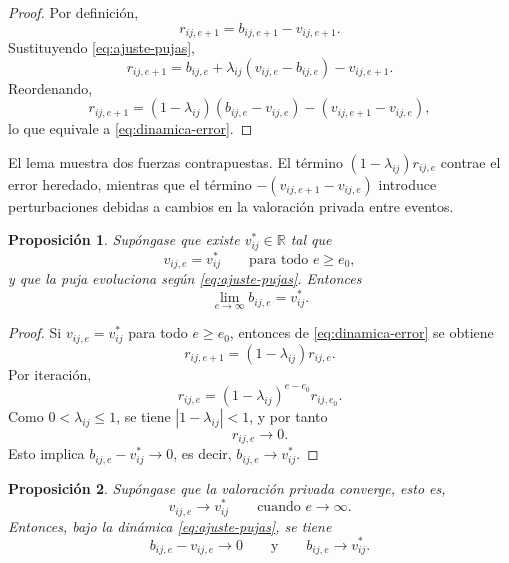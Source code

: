 \documentclass[11pt,a4paper]{article}
\newtheorem{proposicion}{Proposición}
\theoremstyle{definition}
\begin{document}
\begin{proof}
Por definición,
\[
r_{ij,e+1}=b_{ij,e+1}-v_{ij,e+1}.
\]
Sustituyendo \eqref{eq:ajuste-pujas},
\[
r_{ij,e+1}=b_{ij,e}+\lambda_{ij}(v_{ij,e}-b_{ij,e})-v_{ij,e+1}.
\]
Reordenando,
\[
r_{ij,e+1}=(1-\lambda_{ij})(b_{ij,e}-v_{ij,e})-(v_{ij,e+1}-v_{ij,e}),
\]
lo que equivale a \eqref{eq:dinamica-error}.
\end{proof}

El lema muestra dos fuerzas contrapuestas. El término $(1-\lambda_{ij})r_{ij,e}$ contrae el error heredado, mientras que el término $-(v_{ij,e+1}-v_{ij,e})$ introduce perturbaciones debidas a cambios en la valoración privada entre eventos.

\begin{proposicion}\label{prop:convergencia-constante}
Supóngase que existe $v_{ij}^\ast\in\mathbb{R}$ tal que
\[
v_{ij,e}=v_{ij}^\ast
\qquad\text{para todo } e\geq e_0,
\]
y que la puja evoluciona según \eqref{eq:ajuste-pujas}. Entonces
\[
\lim_{e\to\infty} b_{ij,e}=v_{ij}^\ast.
\]
\end{proposicion}

\begin{proof}
Si $v_{ij,e}=v_{ij}^\ast$ para todo $e\geq e_0$, entonces de \eqref{eq:dinamica-error} se obtiene
\[
r_{ij,e+1}=(1-\lambda_{ij})r_{ij,e}.
\]
Por iteración,
\[
r_{ij,e}=(1-\lambda_{ij})^{e-e_0}r_{ij,e_0}.
\]
Como $0<\lambda_{ij}\leq 1$, se tiene $|1-\lambda_{ij}|<1$, y por tanto
\[
r_{ij,e}\to 0.
\]
Esto implica $b_{ij,e}-v_{ij}^\ast\to 0$, es decir, $b_{ij,e}\to v_{ij}^\ast$.
\end{proof}

\begin{proposicion}\label{prop:seguimiento}
Supóngase que la valoración privada converge, esto es,
\[
v_{ij,e}\to v_{ij}^\ast
\qquad\text{cuando } e\to\infty.
\]
Entonces, bajo la dinámica \eqref{eq:ajuste-pujas}, se tiene
\[
b_{ij,e}-v_{ij,e}\to 0
\qquad\text{y}\qquad
b_{ij,e}\to v_{ij}^\ast.
\]
\end{proposicion}
\end{document}
